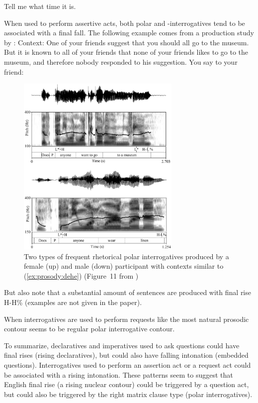 Tell me what time it is.
\eex

When used to perform assertive acts, both polar and \twh-interrogatives tend to be associated with a final fall. The following example comes from a production study by \textcite{dehe2020rhetoric}:
Context: One of your friends suggest that you should all go to the museum. But it is known to all of your friends that none of your friends likes to go to the museum, and therefore nobody responded to his suggestion. You say to your friend: 
\eex
\begin{figure}[H]
\begin{center}
\includegraphics[width = 0.7\textwidth]{figures/rhe-polar.jpg}
	\caption{Two types of frequent rhetorical polar interrogatives produced by a female (up) and male (down) participant with contexts similar to (\ref{ex:prosody:dehe}) (Figure~11 from \cite{dehe2020rhetoric}) }\label{fig:rhe-polar}
\end{center}
\end{figure}

But \textcite{dehe2020rhetoric} also note that a substantial amount of sentences are produced with final rise H-H\% (examples are not given in the paper). 

When interrogatives are used to perform requests like  the most natural prosodic contour seems to be regular polar interrogative contour. 

To summarize, declaratives and imperatives used to ask questions could have final rises (rising declaratives), but could also have falling intonation (embedded questions). Interrogatives used to perform an assertion act or a request act could be associated with a rising intonation. These patterns seem to suggest that English final rise (a rising nuclear contour) could be triggered by a question act, but could also be triggered by the right matrix clause type (polar interrogatives).  


